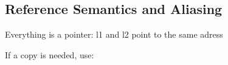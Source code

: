 \subsection{Reference Semantics and Aliasing}
Everything is a pointer: l1 and l2 point to the same adress


If a copy is needed, use:
